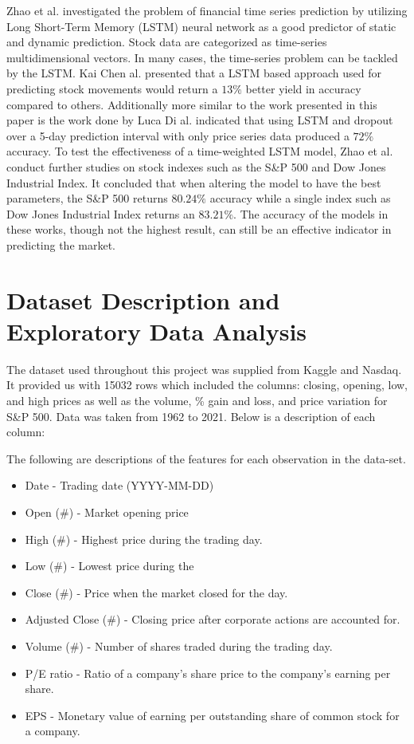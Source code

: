 \documentclass{article}
\begin{document}
Zhao et al. investigated the problem of financial time series prediction by utilizing Long Short-Term Memory (LSTM) neural network as a good predictor of static and dynamic prediction. Stock data are categorized as time-series multidimensional vectors. In many cases, the time-series problem can be tackled by the LSTM. Kai Chen al. presented that a LSTM based approach used for predicting stock movements would return a $13\%$ better yield in accuracy compared to others.\cite{LSTM} Additionally more similar to the work presented in this paper is the work done by Luca Di al. indicated that using LSTM and dropout over a 5-day prediction interval with only price series data produced a $72\%$ accuracy.\cite{Time-Weighted LSTM} To test the effectiveness of a time-weighted LSTM model, Zhao et al. conduct further studies on stock indexes such as the S\&P 500 and Dow Jones Industrial Index. It concluded that when altering the model to have the best parameters, the S\&P 500 returns $80.24\%$ accuracy while a single index such as Dow Jones Industrial Index returns an $83.21\%$.\cite{RNN} The accuracy of the models in these works, though not the highest result, can still be an effective indicator in predicting the market.

\section{Dataset Description and Exploratory Data Analysis} 
The dataset used throughout this project was supplied from Kaggle and Nasdaq. It provided us with 15032 rows which included the columns: closing, opening, low, and high prices as well as the volume, \% gain and loss, and price variation for S\&P 500. Data was taken from 1962 to 2021.\cite{SNP_Daily} 
Below is a description of each column:

The following are descriptions of the features for each observation in the data-set.

	\begin{itemize}
		\item Date - Trading date (YYYY-MM-DD)
		\item Open (\#) - Market opening price
		\item High (\#) - Highest price during the trading day.
		\item Low (\#) - Lowest price during the
		\item Close (\#) - Price when the market closed for the day.
		\item Adjusted Close (\#) - Closing price after corporate actions are accounted for.
		\item Volume (\#) - Number of shares traded during the trading day.
		\item P/E ratio - Ratio of a company's share price to the company's earning per share.
		\item EPS - Monetary value of earning per outstanding share of common stock for a company.
	\end{itemize}
	
\end{document}
